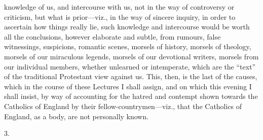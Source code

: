 knowledge of us, and intercourse with us, not in the way
of controversy or criticism, but what is prior—viz., in
the way of sincere inquiry, in order to ascertain how
things really lie, such knowledge and intercourse would
be worth all the conclusions, however elaborate and
subtle, from rumours, false witnessings, suspicions,
romantic scenes, morsels of history, morsels of theology,
morsels of our miraculous legends, morsels of our
devotional writers, morsels from our individual members,
whether unlearned or intemperate, which are the
``text'' of the traditional Protestant view
against us. This, then, is the last of the causes, which
in the course of these Lectures I shall assign, and on
which this evening I shall insist, by way of accounting
for the hatred and contempt shown towards the Catholics
of England by their fellow-countrymen—viz., that the
Catholics of England, as a body, are not personally
known.

3.

